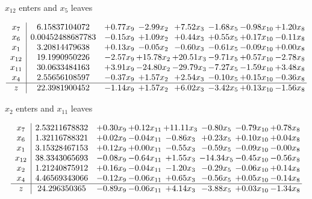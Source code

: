 \documentclass[8pt]{article}
\begin{document}
 $ x_{12} $ enters and $ x_{5} $ leaves 

 \[\begin{array}{c| c c@{\hskip 2pt} c@{\hskip 2pt} c@{\hskip 2pt} c@{\hskip 2pt} c@{\hskip 2pt} c@{\hskip 2pt} }
 x_{7}   &  6.15837104072 & +  0.77 x_{9} & -2.99 x_{2} & +  7.52 x_{3} & -1.68 x_{5} & -0.98 x_{10} & +  1.20 x_{8}\\
 x_{6}   &  0.00452488687783 & -0.15 x_{9} & +  1.09 x_{2} & +  0.44 x_{3} & +  0.55 x_{5} & +  0.17 x_{10} & -0.11 x_{8}\\
 x_{1}   &  3.20814479638 & +  0.13 x_{9} & -0.05 x_{2} & -0.60 x_{3} & -0.61 x_{5} & -0.09 x_{10} & +  0.00 x_{8}\\
 x_{12}   &  19.1990950226 & -2.57 x_{9} & + 15.78 x_{2} & + 20.51 x_{3} & -9.71 x_{5} & +  0.57 x_{10} & -2.78 x_{8}\\
 x_{11}   &  30.0633484163 & +  3.91 x_{9} & -24.80 x_{2} & -29.79 x_{3} & -7.27 x_{5} & -1.59 x_{10} & +  3.48 x_{8}\\
 x_{4}   &  2.55656108597 & -0.37 x_{9} & +  1.57 x_{2} & +  2.54 x_{3} & -0.10 x_{5} & +  0.15 x_{10} & -0.36 x_{8}\\
\hline
z    &  22.3981900452 & -1.14 x_{9} & +  1.57 x_{2} & +  6.02 x_{3} & -3.42 x_{5} & +  0.13 x_{10} & -1.56 x_{8}\\
\end{array}\]


 $ x_{2} $ enters and $ x_{11} $ leaves 

 \[\begin{array}{c| c c@{\hskip 2pt} c@{\hskip 2pt} c@{\hskip 2pt} c@{\hskip 2pt} c@{\hskip 2pt} c@{\hskip 2pt} }
 x_{7}   &  2.53211678832 & +  0.30 x_{9} & +  0.12 x_{11} & + 11.11 x_{3} & -0.80 x_{5} & -0.79 x_{10} & +  0.78 x_{8}\\
 x_{6}   &  1.32116788321 & +  0.02 x_{9} & -0.04 x_{11} & -0.86 x_{3} & +  0.23 x_{5} & +  0.10 x_{10} & +  0.04 x_{8}\\
 x_{1}   &  3.15328467153 & +  0.12 x_{9} & +  0.00 x_{11} & -0.55 x_{3} & -0.59 x_{5} & -0.09 x_{10} & -0.00 x_{8}\\
 x_{12}   &  38.3343065693 & -0.08 x_{9} & -0.64 x_{11} & +  1.55 x_{3} & -14.34 x_{5} & -0.45 x_{10} & -0.56 x_{8}\\
 x_{2}   &  1.21240875912 & +  0.16 x_{9} & -0.04 x_{11} & -1.20 x_{3} & -0.29 x_{5} & -0.06 x_{10} & +  0.14 x_{8}\\
 x_{4}   &  4.46569343066 & -0.12 x_{9} & -0.06 x_{11} & +  0.65 x_{3} & -0.56 x_{5} & +  0.05 x_{10} & -0.14 x_{8}\\
\hline
z    &  24.296350365 & -0.89 x_{9} & -0.06 x_{11} & +  4.14 x_{3} & -3.88 x_{5} & +  0.03 x_{10} & -1.34 x_{8}\\
\end{array}\]
\end{document}
